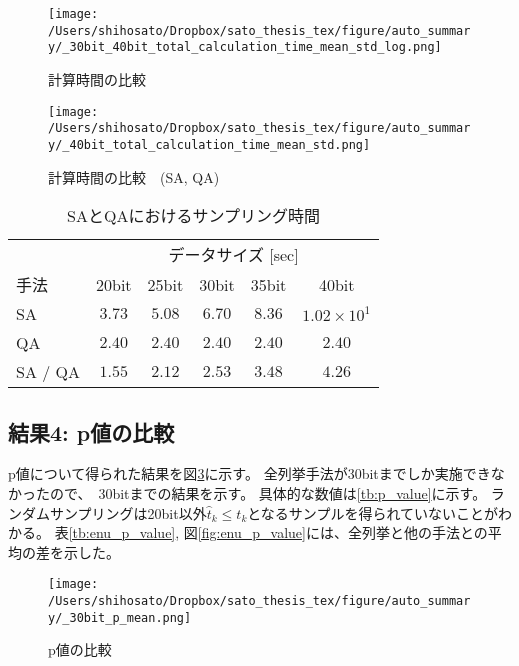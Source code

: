 \documentclass[12pt, dvipdfmx]{jmaster}
\theoremstyle{definition}
\begin{document}
\begin{figure}
	\begin{center}
		\texttt{[image: /Users/shihosato/Dropbox/sato\_thesis\_tex/figure/auto\_summary/\_30bit\_40bit\_total\_calculation\_time\_mean\_std\_log.png]}
	\end{center}
	\caption{計算時間の比較}
	\label{fig:total_time}
\end{figure}

\begin{figure}
	\begin{center}
		\texttt{[image: /Users/shihosato/Dropbox/sato\_thesis\_tex/figure/auto\_summary/\_40bit\_total\_calculation\_time\_mean\_std.png]}
	\end{center}
	\caption{計算時間の比較　(SA, QA)}
	\label{fig:SA_QA_total_time}
\end{figure}


\begin{table}[hbtp]
	\caption{SAとQAにおけるサンプリング時間}
	\label{tb:sampling_time_SA_QA}
	\centering
	\begin{tabular}{lccccc}
		\hline
		& \multicolumn{5}{c}{データサイズ [sec]}\\
		手法& 20bit & 25bit & 30bit & 35bit & 40bit\\
		\hline\hline
		SA & $3.73$ & $5.08$ & $6.70$ & $8.36$ & $1.02\times 10^{1}$\\
		\hline
		QA & $2.40$ & $2.40$ & $2.40$ & $2.40$ & $2.40$\\
		\hline
		SA / QA & $1.55$ & $2.12$ & $2.53$ & $3.48$ & $4.26$\\
		\hline
	\end{tabular}
\end{table}

\subsection{結果4: p値の比較}
p値について得られた結果を図\ref{fig:p_value}に示す。
全列挙手法が30bitまでしか実施できなかったので、　30bitまでの結果を示す。
具体的な数値は\ref{tb:p_value}に示す。
ランダムサンプリングは20bit以外$\hat{t}_k \le t_k$となるサンプルを得られていないことがわかる。
表\ref{tb:enu_p_value}, 図\ref{fig:enu_p_value}には、全列挙と他の手法との平均の差を示した。


\begin{figure}
	\begin{center}
		\texttt{[image: /Users/shihosato/Dropbox/sato\_thesis\_tex/figure/auto\_summary/\_30bit\_p\_mean.png]}
	\end{center}
	\caption{p値の比較}
	\label{fig:p_value}
\end{figure}
\end{document}
